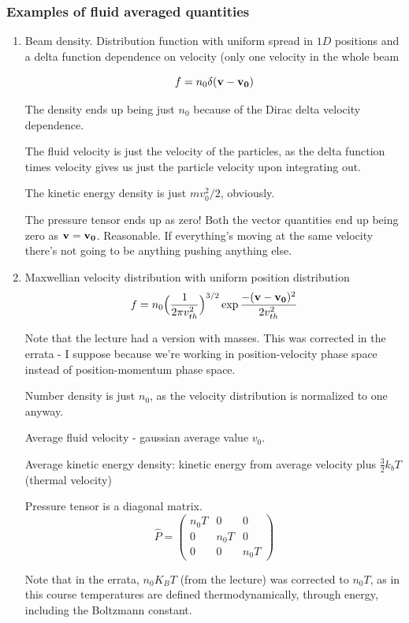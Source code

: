 \documentclass[PlasmaNotes.tex]{subfiles}
\begin{document}
\subsubsection{Examples of fluid averaged quantities}
\begin{enumerate}
\item Beam density. Distribution function with uniform spread in $1D$ positions and a delta function dependence on velocity (only one velocity in the whole beam

\[ f = n_0 \delta(\mathbf{v} - \mathbf{v_0}) \]

The density ends up being just $n_0$ because of the Dirac delta velocity dependence.

The fluid velocity is just the velocity of the particles, as the delta function times velocity gives us just the particle velocity upon integrating out.

The kinetic energy density is just $m v_0^2/2$, obviously.

The pressure tensor ends up as zero! Both the vector quantities end up being zero as $\mathbf{v} = \mathbf{v_0}$. Reasonable. If everything's moving at the same velocity there's not going to be anything pushing anything else.

\item Maxwellian velocity distribution with uniform position distribution
\[ f = n_0 \Big( \frac{1}{2 \pi v_{th}^2} \Big)^{3/2} \exp{\frac{-(\ensuremath{\mathbf{v}}-\ensuremath{\mathbf{v_0}})^2}{2 v_{th}^2}} \]

Note that the lecture had a version with masses. This was corrected in the errata - I suppose because we're working in position-velocity phase space instead of position-momentum phase space.

Number density is just $n_0$, as the velocity distribution is normalized to one anyway.

Average fluid velocity - gaussian average value $v_0$. 

Average kinetic energy density: kinetic energy from average velocity plus $\frac{3}{2} k_b T$ (thermal velocity)

Pressure tensor is a diagonal matrix.
\[\hat{P} = 
\begin{pmatrix}
n_0 T & 0 & 0 \\
0 & n_0 T & 0 \\
0 & 0 & n_0 T
\end{pmatrix} \]

Note that in the errata, $n_0 K_B T$ (from the lecture) was corrected to $n_0 T$, as in this course temperatures are defined thermodynamically, through energy, including the Boltzmann constant.

\end{enumerate}
\end{document}
